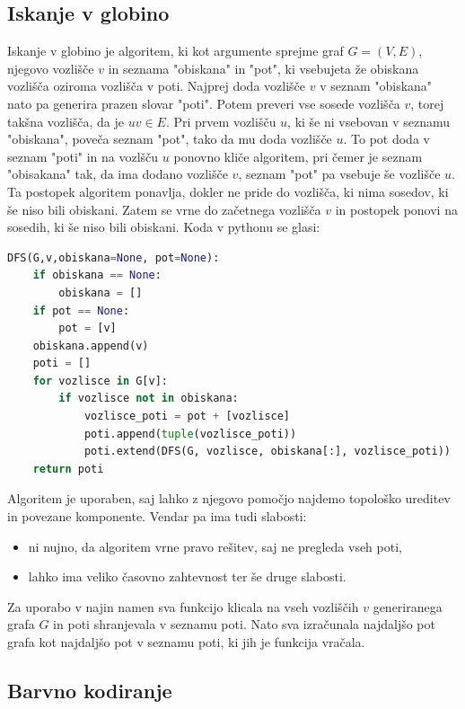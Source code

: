 \documentclass[a4paper, 9pt]{article}
\begin{document}
\subsection{Iskanje v globino}
Iskanje v globino je algoritem, ki kot argumente sprejme graf $G = (V,E)$, njegovo vozlišče $v$ in seznama "obiskana" in "pot", ki vsebujeta že obiskana vozlišča oziroma vozlišča v poti. Najprej doda vozlišče $v$ v seznam "obiskana" nato pa generira prazen slovar "poti". Potem preveri vse sosede vozlišča $v$, torej takšna vozlišča, da je $uv \in E$. Pri prvem vozlišču $u$, ki še ni vsebovan v seznamu "obiskana", poveča seznam "pot", tako da mu doda vozlišče $u$. To pot doda v seznam "poti" in na vozlšču $u$ ponovno kliče algoritem, pri čemer je seznam "obisakana" tak, da ima dodano vozlišče $v$, seznam "pot" pa vsebuje še vozlišče $u$. Ta postopek algoritem ponavlja, dokler ne pride do vozlišča, ki nima sosedov, ki še niso bili obiskani. Zatem se vrne do začetnega vozlišča $v$ in postopek ponovi na sosedih, ki še niso bili obiskani.
Koda v pythonu se glasi:

\begin{lstlisting}[language=Python]
    DFS(G,v,obiskana=None, pot=None):
    if obiskana == None:
        obiskana = []
    if pot == None:
        pot = [v]
    obiskana.append(v)
    poti = []
    for vozlisce in G[v]:
        if vozlisce not in obiskana:
            vozlisce_poti = pot + [vozlisce]
            poti.append(tuple(vozlisce_poti))
            poti.extend(DFS(G, vozlisce, obiskana[:], vozlisce_poti))
    return poti
\end{lstlisting}

Algoritem je uporaben, saj lahko z njegovo pomočjo najdemo topološko ureditev in povezane komponente. Vendar pa ima tudi slabosti:
\begin{itemize}
    \item ni nujno, da algoritem vrne pravo rešitev, saj ne pregleda vseh poti,
    \item lahko ima veliko časovno zahtevnost ter še druge slabosti.
\end{itemize}

Za uporabo v najin namen sva funkcijo klicala na vseh vozliščih $v$ generiranega grafa $G$ in poti shranjevala v seznamu poti. Nato sva izračunala najdaljšo pot grafa kot najdaljšo pot v seznamu poti, ki jih je funkcija vračala.

\subsection{Barvno kodiranje}
\end{document}
